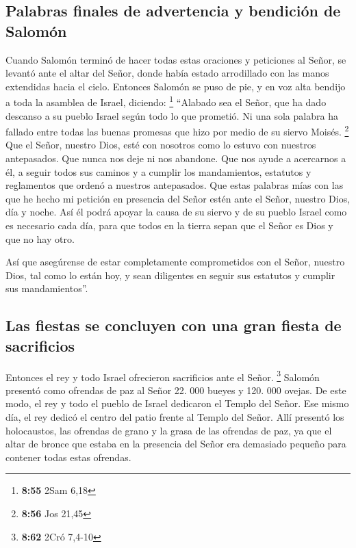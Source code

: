 \hypertarget{palabras-finales-de-advertencia-y-bendiciuxf3n-de-salomuxf3n}{%
\subsection{Palabras finales de advertencia y bendición de
Salomón}\label{palabras-finales-de-advertencia-y-bendiciuxf3n-de-salomuxf3n}}

 Cuando Salomón terminó de hacer todas estas oraciones y
peticiones al Señor, se levantó ante el altar del Señor, donde había
estado arrodillado con las manos extendidas hacia el cielo.
 Entonces Salomón se puso de pie, y en voz alta bendijo a
toda la asamblea de Israel, diciendo: \footnote{\textbf{8:55} 2Sam 6,18}
 ``Alabado sea el Señor, que ha dado descanso a su pueblo
Israel según todo lo que prometió. Ni una sola palabra ha fallado entre
todas las buenas promesas que hizo por medio de su siervo Moisés.
\footnote{\textbf{8:56} Jos 21,45}  Que el Señor, nuestro
Dios, esté con nosotros como lo estuvo con nuestros antepasados. Que
nunca nos deje ni nos abandone.  Que nos ayude a
acercarnos a él, a seguir todos sus caminos y a cumplir los
mandamientos, estatutos y reglamentos que ordenó a nuestros antepasados.
 Que estas palabras mías con las que he hecho mi petición
en presencia del Señor estén ante el Señor, nuestro Dios, día y noche.
Así él podrá apoyar la causa de su siervo y de su pueblo Israel como es
necesario cada día,  para que todos en la tierra sepan
que el Señor es Dios y que no hay otro.

 Así que asegúrense de estar completamente comprometidos
con el Señor, nuestro Dios, tal como lo están hoy, y sean diligentes en
seguir sus estatutos y cumplir sus mandamientos''.

\hypertarget{las-fiestas-se-concluyen-con-una-gran-fiesta-de-sacrificios}{%
\subsection{Las fiestas se concluyen con una gran fiesta de
sacrificios}\label{las-fiestas-se-concluyen-con-una-gran-fiesta-de-sacrificios}}

 Entonces el rey y todo Israel ofrecieron sacrificios
ante el Señor. \footnote{\textbf{8:62} 2Cró 7,4-10} 
Salomón presentó como ofrendas de paz al Señor 22. 000 bueyes y 120. 000
ovejas. De este modo, el rey y todo el pueblo de Israel dedicaron el
Templo del Señor.  Ese mismo día, el rey dedicó el centro
del patio frente al Templo del Señor. Allí presentó los holocaustos, las
ofrendas de grano y la grasa de las ofrendas de paz, ya que el altar de
bronce que estaba en la presencia del Señor era demasiado pequeño para
contener todas estas ofrendas.

